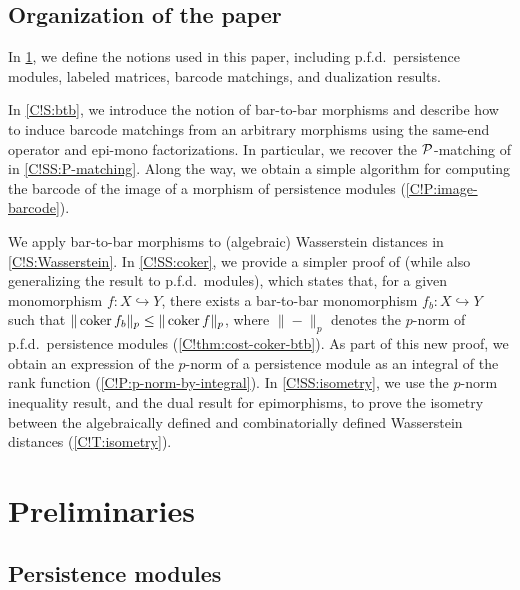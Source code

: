 \subsection{Organization of the paper}

In \cref{C!S:preliminaries}, we define the notions used in this paper, including p.f.d.\ persistence modules, labeled matrices, barcode matchings, and dualization results.

In \cref{C!S:btb}, we introduce the notion of bar-to-bar morphisms and describe how to induce barcode matchings from an arbitrary morphisms using the same-end operator and epi-mono factorizations. In particular, we recover the $\mathcal{P}$-matching of \cite{GST2025} in \cref{C!SS:P-matching}. Along the way, we obtain a simple algorithm for computing the barcode of the image of a morphism of persistence modules (\cref{C!P:image-barcode}).

We apply bar-to-bar morphisms to (algebraic) Wasserstein distances in \cref{C!S:Wasserstein}. In \cref{C!SS:coker}, we provide a simpler proof of \cite[Theorem 3.14]{AGRS2025} (while also generalizing the result to p.f.d.\ modules), which states that, for a given monomorphism $f \colon X \hookrightarrow Y$, there exists a bar-to-bar monomorphism $f_b \colon X \hookrightarrow Y$ such that $\| \operatorname{coker} f_b \|_p \leq \| \operatorname{coker} f \|_p$, where $\| - \|_p$ denotes the $p$-norm of p.f.d.\ persistence modules (\cref{C!thm:cost-coker-btb}). As part of this new proof, we obtain an expression of the $p$-norm of a persistence module as an integral of the rank function (\cref{C!P:p-norm-by-integral}). In \cref{C!SS:isometry}, we use the $p$-norm inequality result, and the dual result for epimorphisms, to prove the isometry between the algebraically defined and combinatorially defined Wasserstein distances (\cref{C!T:isometry}).

\section{Preliminaries}
\label{C!S:preliminaries}

\subsection{Persistence modules} 

